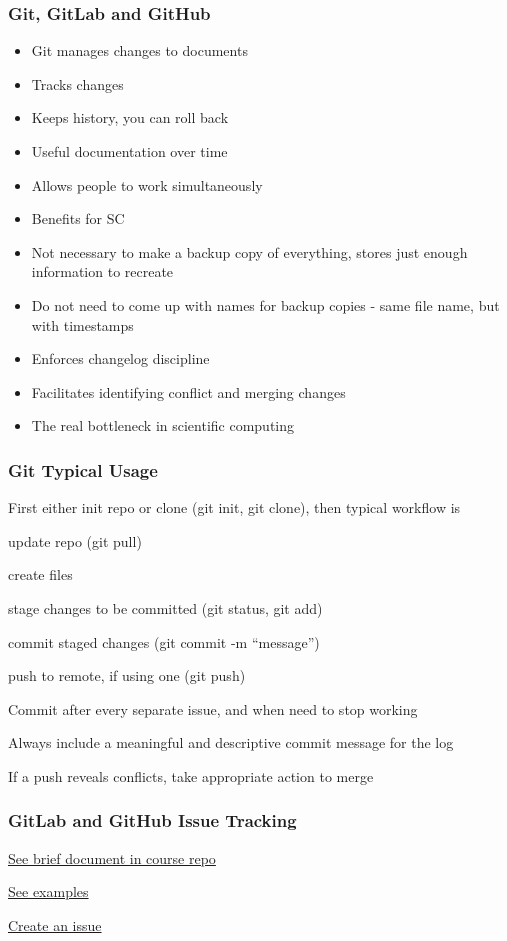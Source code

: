 \documentclass[t,12pt,numbers,fleqn]{beamer}
\begin{document}
\begin{frame}
\frametitle{Git, GitLab and GitHub}
\begin{itemize}
\item Git manages changes to documents
\bi
\item Tracks changes
\item Keeps history, you can roll back
\item Useful documentation over time
\item Allows people to work simultaneously
\ei
\item Benefits for SC \cite{WilsonEtAl2016}
\bi
\item Not necessary to make a backup copy of everything, stores just enough
  information to recreate
\item Do not need to come up with names for backup copies - same file name, but
  with timestamps
\item Enforces changelog discipline
\item Facilitates identifying conflict and merging changes
\ei
\item The real bottleneck in scientific computing~\cite{Wilson2006}
\end{itemize}
\end{frame}


\begin{frame}
\frametitle{Git Typical Usage}

First either init repo or clone (git init, git clone), then typical workflow is
\be
\item update repo (git pull)
\item create files
\item stage changes to be committed (git status, git add)
\item commit staged changes (git commit -m ``message'')
\item push to remote, if using one (git push)
\ee
\bi
\item Commit after every separate issue, and when need to stop working
\item Always include a meaningful and descriptive commit message for the log
\item If a push reveals conflicts, take appropriate action to merge
\ei
\end{frame}


\begin{frame}
\frametitle{GitLab and GitHub Issue Tracking}

\bi
\item \href{https://gitlab.cas.mcmaster.ca/smiths/cas741/tree/master/ToolTutorials/gitAndGitLab}{See brief document in course repo}
\item \href{https://github.com/JacquesCarette/literate-scientific-software/issues}{See
  examples}
\item \href{https://gitlab.cas.mcmaster.ca/smiths/cas741/issues}{Create an issue}
\ei

\end{frame}
\end{document}
